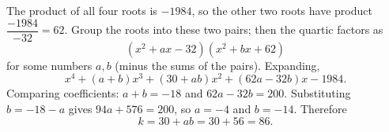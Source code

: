 The product of all four roots is $-1984$, so the other two roots have product $\dfrac{-1984}{-32}=62$. Group the roots into these two pairs; then the quartic factors as
\[
(x^2+ax-32)(x^2+bx+62)
\]
for some numbers $a,b$ (minus the sums of the pairs). Expanding,
\[
x^4+(a+b)x^3+(30+ab)x^2+(62a-32b)x-1984 .
\]
Comparing coefficients: $a+b=-18$ and $62a-32b=200$. Substituting $b=-18-a$ gives $94a+576=200$, so $a=-4$ and $b=-14$. Therefore
\[
k=30+ab=30+56=\boxed{86}.
\]
